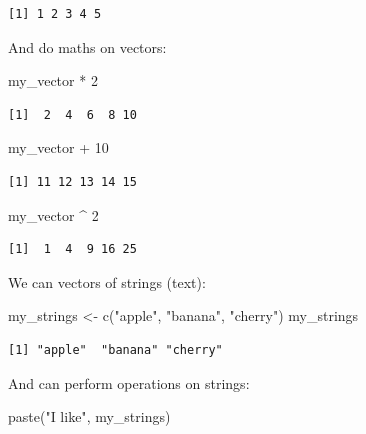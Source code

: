 \documentclass[
  letterpaper,
  8pt,
  a4paper]{book}
\newenvironment{Shaded}{\begin{snugshade}}{\end{snugshade}}
\newcommand{\DecValTok}[1]{\textcolor[rgb]{0.68,0.00,0.00}{#1}}
\newcommand{\FunctionTok}[1]{\textcolor[rgb]{0.28,0.35,0.67}{#1}}
\newcommand{\NormalTok}[1]{\textcolor[rgb]{0.00,0.23,0.31}{#1}}
\newcommand{\OtherTok}[1]{\textcolor[rgb]{0.00,0.23,0.31}{#1}}
\newcommand{\SpecialCharTok}[1]{\textcolor[rgb]{0.37,0.37,0.37}{#1}}
\newcommand{\StringTok}[1]{\textcolor[rgb]{0.13,0.47,0.30}{#1}}
\begin{document}
\begin{verbatim}
[1] 1 2 3 4 5
\end{verbatim}

And do maths on vectors:

\begin{Shaded}
\begin{Highlighting}[]
\NormalTok{my\_vector }\SpecialCharTok{*} \DecValTok{2}
\end{Highlighting}
\end{Shaded}

\begin{verbatim}
[1]  2  4  6  8 10
\end{verbatim}

\begin{Shaded}
\begin{Highlighting}[]
\NormalTok{my\_vector }\SpecialCharTok{+} \DecValTok{10}
\end{Highlighting}
\end{Shaded}

\begin{verbatim}
[1] 11 12 13 14 15
\end{verbatim}

\begin{Shaded}
\begin{Highlighting}[]
\NormalTok{my\_vector }\SpecialCharTok{\^{}} \DecValTok{2}
\end{Highlighting}
\end{Shaded}

\begin{verbatim}
[1]  1  4  9 16 25
\end{verbatim}

We can vectors of strings (text):

\begin{Shaded}
\begin{Highlighting}[]
\NormalTok{my\_strings }\OtherTok{\textless{}{-}} \FunctionTok{c}\NormalTok{(}\StringTok{"apple"}\NormalTok{, }\StringTok{"banana"}\NormalTok{, }\StringTok{"cherry"}\NormalTok{)}
\NormalTok{my\_strings}
\end{Highlighting}
\end{Shaded}

\begin{verbatim}
[1] "apple"  "banana" "cherry"
\end{verbatim}

And can perform operations on strings:

\begin{Shaded}
\begin{Highlighting}[]
\FunctionTok{paste}\NormalTok{(}\StringTok{"I like"}\NormalTok{, my\_strings)}
\end{Highlighting}
\end{Shaded}
\end{document}
